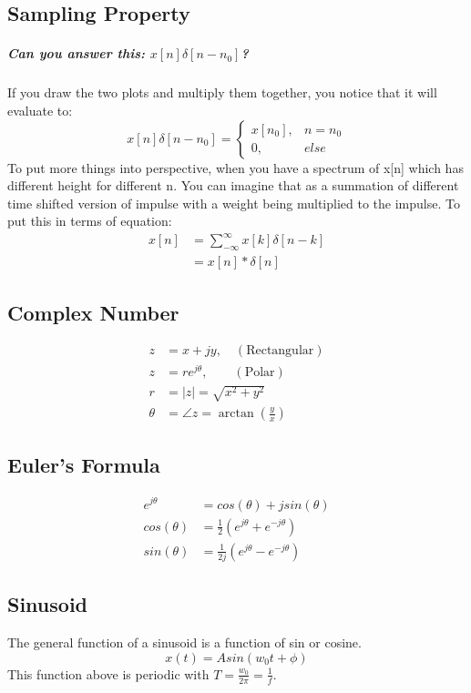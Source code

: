 \subsection*{Sampling Property}
\subparagraph*{Can you answer this: $x[n]\delta[n-n_0]$?} If you draw the two plots and multiply them together, you notice that it will evaluate to:
\[
    x[n]\delta[n-n_0] = 
    \begin{cases}
        x[n_0], &n=n_0 \\
        0, &else
    \end{cases}
\]
To put more things into perspective, when you have a spectrum of x[n] which has different height for different n. You can imagine that as a summation of different time shifted version of impulse with a weight being multiplied to the impulse. To put this in terms of equation:
\begin{align*}
    x[n] &= \sum_{-\infty}^{\infty}x[k]\delta[n-k] \\
         &= x[n] \ast \delta[n]
\end{align*}

\subsection*{Complex Number}
\begin{align*}
    z &= x+jy, \quad(\text{Rectangular}) \\
    z &= re^{j\theta}, \quad\quad(\text{Polar}) \\
    r &= \left\lvert z \right\rvert = \sqrt{x^2+y^2}\\
    \theta &= \angle  z = \arctan(\frac{y}{x})
\end{align*}

\subsection*{Euler's Formula}
\begin{align*}
    e^{j\theta} &= cos(\theta) + jsin(\theta) \\
    cos(\theta) &= \frac{1}{2}(e^{j\theta}+e^{-j\theta})\\
    sin(\theta) &= \frac{1}{2j}(e^{j\theta}-e^{-j\theta})
\end{align*}

\subsection*{Sinusoid}
The general function of a sinusoid is a function of sin or cosine.
\[
    x(t)=Asin(w_0 t + \phi)
\]
This function above is periodic with $T = \frac{w_0}{2\pi}=\frac{1}{f}$.

